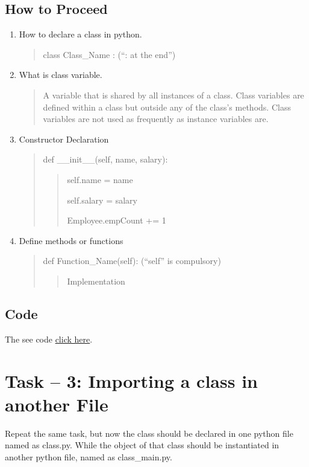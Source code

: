 \documentclass[letterpaper,10pt,english]{sphinxmanual}
\begin{document}
\subsection{How to Proceed}
\label{week-08:id1}\begin{enumerate}
\item {} 
How to declare a class in python.
\begin{quote}

class Class\_Name : (“: at the end”)
\end{quote}

\item {} 
What is class variable.
\begin{quote}

A variable that is shared by all instances of a class. Class variables are defined within a class but   outside any of the class's methods. Class variables are not used as frequently as instance      variables are.
\end{quote}

\item {} 
Constructor Declaration
\begin{quote}

def \_\_init\_\_(self, name, salary):
\begin{quote}

self.name = name

self.salary = salary

Employee.empCount += 1
\end{quote}
\end{quote}

\item {} 
Define methods or functions
\begin{quote}

def Function\_Name(self):        (“self” is compulsory)
\begin{quote}

Implementation
\end{quote}
\end{quote}

\end{enumerate}


\subsection{Code}
\label{week-08:code}
The see code \href{https://github.com/LinuxIoT/training/blob/DEV/get\_fs\_dict\_class.py}{click here}.


\section{Task – 3: Importing a class in another File}
\label{week-08:task-3-importing-a-class-in-another-file}
Repeat the same task, but now the class should be declared in one python file named as class.py. While the object of that class should be instantiated in another python file, named as class\_main.py.
\end{document}
